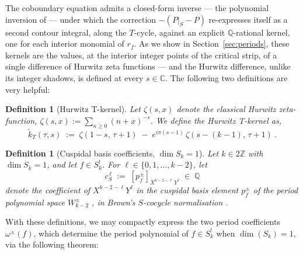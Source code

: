 \documentclass[11pt]{article}
\newtheorem{definition}[theorem]{Definition}
\numberwithin{equation}{section}  %
\newcommand{\ZZ}{\mathbb{Z}}
\newcommand{\QQ}{\mathbb{Q}}
\newcommand{\CC}{\mathbb{C}}
\begin{document}
 
 
The coboundary equation admits a closed-form inverse --- the polynomial
inversion of \cite{DR2017} --- under which the correction $-(P|_S - P)$
re-expresses itself as a second contour integral, along the $T$-cycle,
against an explicit $\QQ$-rational kernel, one for each interior monomial
of $r_f$.  As we show in Section~\ref{sec:periods}, these kernels are
the values, at the interior integer points of the critical strip, of a
single difference of Hurwitz zeta functions --- and the Hurwitz
difference, unlike its integer shadows, is defined at every
$s \in \CC$. %
The following two definitions are very helpful:
\begin{definition}[Hurwitz T-kernel]\label{def:HurwitzT}
Let $\zeta(s, x)$ denote the classical Hurwitz zeta-function, $\zeta(s,x):= \sum_{n \geq 0} (n+x)^{-s}$. We define the \emph{Hurwitz T-kernel} as,
\begin{equation}\label{eq:tildekT-def}
  \widetilde{k}_T(\tau, s)
  \;:=\; \zeta(1 - s,\, \tau + 1)
  \;-\; e^{i\pi(s-1)}\,\zeta(s - (k - 1),\, \tau + 1)~.
\end{equation}
\end{definition}
 
\begin{definition}[Cuspidal basis coefficients, $\dim S_k = 1$]\label{def:poly-coeffs-dimSk1} %
Let $k \in 2\ZZ$ with $\dim S_k = 1$, and let $f \in S_k^!$.  For
$\ell \in \{0, 1, \ldots, k - 2\}$, %
let
\begin{equation}\label{eq:cS-def}
  c_S^{\,\ell} \;:=\; [p_f^\pm]_{X^{k-2-\ell}\,Y^{\ell}} \;\in\; \QQ
\end{equation}
denote the coefficient of $X^{k-2-\ell}Y^{\ell}$ in the cuspidal basis
element $p_f^\pm$ of the period polynomial space $W_{k-2}^\pm$
\cite{KZ1984}, in Brown's $S$-cocycle normalisation
\cite{Brown2017}. %
\end{definition}
 
\noindent With these definitions, we may compactly express the two
period coefficients $\omega^{\pm}(f)$, which determine the period
polynomial of $f \in S_k^!$ when $\dim(S_k) = 1$, via the following
theorem: %
 
\end{document}
